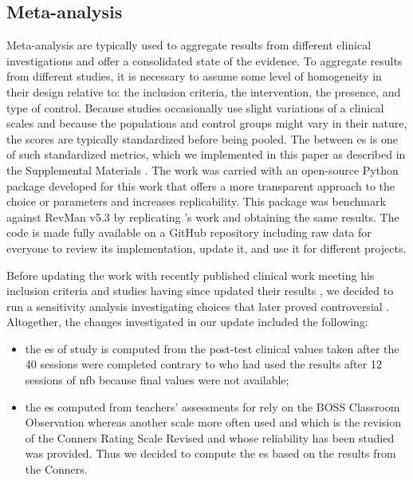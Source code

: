 \subsection{Meta-analysis}

Meta-analysis are typically used to aggregate results from different clinical investigations and offer a consolidated 
state of the evidence. To aggregate results from different studies, it is necessary to assume some level of homogeneity 
in their design relative to: the inclusion criteria, the intervention, the presence, and type of control.
Because studies occasionally use slight variations of a clinical scales and because the populations and 
control groups might vary in their nature, the scores are typically standardized before being pooled. 
The between \gls{es} is one of such standardized metrics, which we implemented in this paper as described 
in the Supplemental Materials . The work was carried with an open-source 
Python package developed for this work that offers a more transparent approach to the choice or parameters 
and increases replicability. This package was benchmark against RevMan v5.3 \citep{RevMan}
by replicating \citet{Cortese2016}'s work and obtaining the same results. The code is made fully available 
on a GitHub repository \cite{} including raw data for everyone to review its implementation, update it, and 
use it for different projects. 
 
Before updating the \citet{Cortese2016} work with recently published clinical work meeting his inclusion criteria 
\citep{Strehl2017, Baumeister2016} and studies having since updated their results \citep{Arnold2014}, we decided to
run a sensitivity analysis investigating choices that later proved controversial \citep{Micoulaud2016}. Altogether, 
the changes investigated in our update included the following:
\begin{itemize}
\item the \gls{es} of \citeauthor{Arnold2014} study is computed from the post-test clinical values taken after the 40 sessions were completed 
contrary to \citet{Cortese2016} who had used the results after 12 sessions of \gls{nfb} because final values were not available;
\item the \gls{es} computed from teachers' assessments for \citet{Steiner2014} rely on the BOSS Classroom Observation \citep{Shapiro2010} whereas 
another scale more often used \citep{Christiansen2014, Bluschke2016} and which is the revision of the Conners Rating Scale Revised \citep{Conners1998} 
and whose reliability has been studied \citep{Collett2003} was provided. Thus we decided to compute the \gls{es} based on the results from the Conners.  
\end{itemize} 

